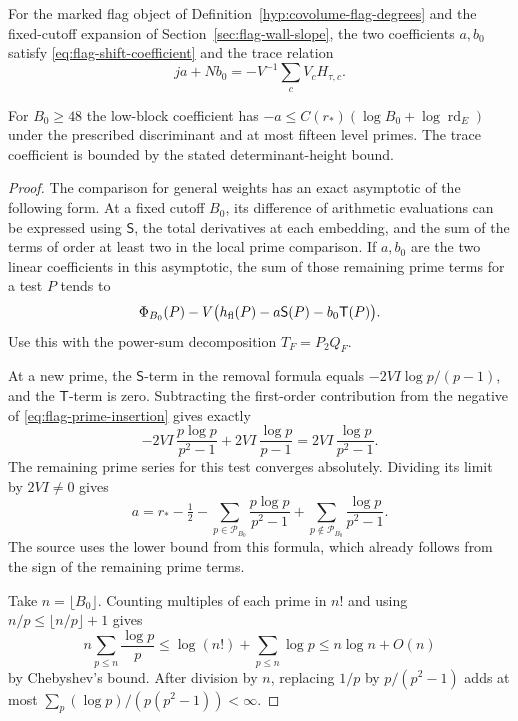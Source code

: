 \begin{proposition}\label{prop:flag-shift-calibrations}
For the marked flag object of Definition~\ref{hyp:covolume-flag-degrees} and the fixed-cutoff expansion of Section~\ref{sec:flag-wall-slope},
the two coefficients \(a,b_0\) satisfy
\eqref{eq:flag-shift-coefficient} and the trace relation
\[
 ja+Nb_0=-V^{-1}\sum_c V_c H_{\tau,c}.
\]

For \(B_0\ge48\) the low-block coefficient has
\(-a\le C(r_*)(\log B_0+\log\operatorname{rd}_E)\)
under the prescribed discriminant and at most fifteen
level primes. The trace coefficient is bounded by the
stated determinant-height bound.
\end{proposition}

\begin{proof}
The comparison for general weights has an exact
asymptotic of the following form. At a fixed cutoff
\(B_0\), its difference of arithmetic evaluations can
be expressed using \(\mathsf S\), the total derivatives
at each embedding, and the sum of the terms of order at
least two in the local prime comparison.
If \(a,b_0\) are the two linear coefficients
in this asymptotic, the sum of those remaining prime
terms for a test \(P\) tends to
\[
 \Phi_{B_0}(P)-V\bigl(h_{\rm fl}(P)
                   -a\mathsf S(P)-b_0\mathsf T(P)\bigr).
\]
Use this with the power-sum decomposition \(T_F=P_2Q_F\).

At a new prime, the \(\mathsf S\)-term in the removal
formula equals \(-2VI\log p/(p-1)\), and the \(\mathsf T\)-term
is zero. Subtracting the first-order contribution from the
negative of \eqref{eq:flag-prime-insertion} gives exactly
\[
 -2VI\,\frac{p\log p}{p^2-1}
     +2VI\,\frac{\log p}{p-1}
          =2VI\,\frac{\log p}{p^2-1}.
\]
The remaining prime series for this test converges
absolutely. Dividing its limit by \(2VI\ne0\) gives
\begin{equation}\label{eq:flag-shift-coefficient}
 a=r_*-\tfrac12
       -\sum_{p\in\mathcal P_{B_0}}\frac{p\log p}{p^2-1}
       +\sum_{p\notin\mathcal P_{B_0}}\frac{\log p}{p^2-1}.
\end{equation}
The source uses the lower bound from this formula,
which already follows from the sign of the remaining
prime terms.

Take \(n=\lfloor B_0\rfloor\). Counting multiples of each
prime in \(n!\) and using \(n/p\le\lfloor n/p\rfloor+1\) gives
\[
 n\sum_{p\le n}\frac{\log p}{p}
    \le \log(n!)+\sum_{p\le n}\log p \le n\log n+O(n)
\]
by Chebyshev's bound. After division by \(n\), replacing \(1/p\)
by \(p/(p^2-1)\) adds at most
\(\sum_p(\log p)/(p(p^2-1))<\infty\).


\end{proof}
